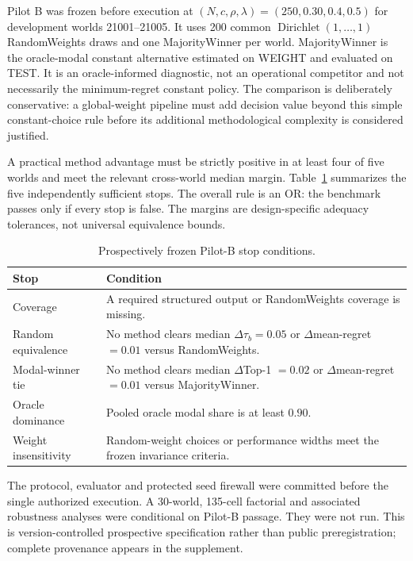 \documentclass[runningheads]{llncs}
\begin{document}
Pilot B was frozen before execution at
$(N,c,\rho,\lambda)=(250,0.30,0.4,0.5)$ for development worlds 21001--21005. It uses 200 common
$\operatorname{Dirichlet}(1,\ldots,1)$ RandomWeights draws and one MajorityWinner per world.
MajorityWinner is the oracle-modal constant alternative estimated on WEIGHT and evaluated on
TEST. It is an oracle-informed diagnostic, not an operational competitor and not necessarily the
minimum-regret constant policy.
The comparison is deliberately conservative: a global-weight pipeline must add decision value
beyond this simple constant-choice rule before its additional methodological complexity is
considered justified.

A practical method advantage must be strictly positive in at least four of five worlds and meet
the relevant cross-world median margin. Table~\ref{tab:gates} summarizes the five independently
sufficient stops. The overall rule is an OR: the benchmark passes only if every stop is false.
The margins are design-specific adequacy tolerances, not universal equivalence bounds.

\begin{table}[t]
\centering
\caption{Prospectively frozen Pilot-B stop conditions.}
\label{tab:gates}
\small
\begin{tabularx}{\linewidth}{@{}l X@{}}
\toprule
\textbf{Stop} & \textbf{Condition}\\
\midrule
Coverage & A required structured output or RandomWeights coverage is missing.\\
Random equivalence & No method clears median $\Delta\tau_b=0.05$ or
$\Delta$mean-regret $=0.01$ versus RandomWeights.\\
Modal-winner tie & No method clears median $\Delta$Top-1 $=0.02$ or
$\Delta$mean-regret $=0.01$ versus MajorityWinner.\\
Oracle dominance & Pooled oracle modal share is at least $0.90$.\\
Weight insensitivity & Random-weight choices or performance widths meet the frozen invariance
criteria.\\
\bottomrule
\end{tabularx}
\end{table}

The protocol, evaluator and protected seed firewall were committed before the single authorized
execution. A 30-world, 135-cell factorial and associated robustness analyses were conditional on
Pilot-B passage. They were not run. This is version-controlled prospective specification rather
than public preregistration; complete provenance appears in the supplement.
\end{document}
